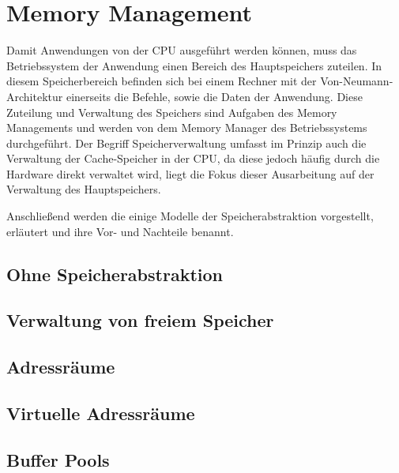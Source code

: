 \section{Memory Management}
\label{sec:MemoryManagement}
Damit Anwendungen von der CPU ausgeführt werden können, muss das Betriebssystem der Anwendung einen Bereich des Hauptspeichers zuteilen. In diesem Speicherbereich befinden sich bei einem Rechner mit der Von-Neumann-Architektur einerseits die Befehle, sowie die Daten der Anwendung. Diese Zuteilung und Verwaltung des Speichers sind Aufgaben des Memory Managements und werden von dem Memory Manager des Betriebssystems durchgeführt. Der Begriff Speicherverwaltung umfasst im Prinzip auch die Verwaltung der Cache-Speicher in der CPU, da diese jedoch häufig durch die Hardware direkt verwaltet wird, liegt die Fokus dieser Ausarbeitung auf der Verwaltung des Hauptspeichers.

Anschließend werden die einige Modelle der Speicherabstraktion vorgestellt, erläutert und ihre Vor- und Nachteile benannt.

\subsection{Ohne Speicherabstraktion}
\label{subsec:OhneSpeicherabstraktion}
\blindtext

\subsection{Verwaltung von freiem Speicher}
\label{subsec:VerwaltungFreiemSpeicher}
\blindtext

\subsection{Adressr\"{a}ume}
\label{subsec:Adressraeume}
\blindtext

\subsection{Virtuelle Adressr\"{a}ume}
\label{subsec:VirtuelleAdressraeume}
\blindtext

\subsection{Buffer Pools}
\label{subsec:BufferPools}
\blindtext
